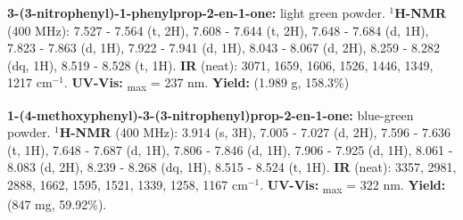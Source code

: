 \documentclass[11pt]{article}
\let\bf\textbf
\begin{document}
\noindent\bf{3-(3-nitrophenyl)-1-phenylprop-2-en-1-one:} light green powder. \bf{$^1$H-NMR} (400 MHz): \textdelta\hspace{0mm} 7.527 - 7.564 (t, 2H), 7.608 - 7.644 (t, 2H), 7.648 - 7.684 (d, 1H), 7.823 - 7.863 (d, 1H), 7.922 - 7.941 (d, 1H), 8.043 - 8.067 (d, 2H), 8.259 - 8.282 (dq, 1H), 8.519 - 8.528 (t, 1H). \bf{IR} (neat): 3071, 1659, 1606, 1526, 1446, 1349, 1217 cm$^{-1}$. \bf{UV-Vis:} \textlambda\textsubscript{max} = 237 nm. \bf{Yield:} (1.989 g, 158.3\%)

\noindent\bf{1-(4-methoxyphenyl)-3-(3-nitrophenyl)prop-2-en-1-one:} blue-green powder. \bf{$^1$H-NMR} (400 MHz): \textdelta\hspace{0mm} 3.914 (s, 3H), 7.005 - 7.027 (d, 2H), 7.596 - 7.636 (t, 1H), 7.648 - 7.687 (d, 1H), 7.806 - 7.846 (d, 1H), 7.906 - 7.925 (d, 1H), 8.061 - 8.083 (d, 2H), 8.239 - 8.268 (dq, 1H), 8.515 - 8.524 (t, 1H). \bf{IR} (neat): 3357, 2981, 2888, 1662, 1595, 1521, 1339, 1258, 1167 cm$^{-1}$. \bf{UV-Vis:} \textlambda\textsubscript{max} = 322 nm. \bf{Yield:} (847 mg, 59.92\%).
\end{document}
